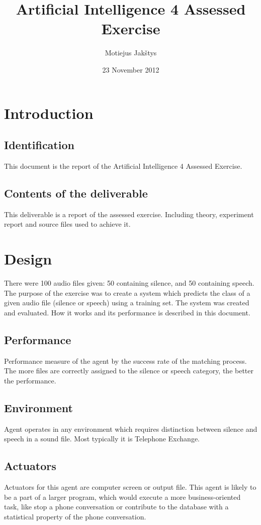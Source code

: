 \documentclass[english,11pt]{article}
\numberwithin{equation}{section}
\begin{document}
\title{Artificial Intelligence 4 Assessed Exercise}
\author{Motiejus Jakštys}
\date{23 November 2012}

\maketitle
\pagebreak
\tableofcontents
\pagebreak

\section{Introduction}
\subsection{Identification}
This document is the report of the Artificial Intelligence 4 Assessed
Exercise.

\subsection{Contents of the deliverable}
This deliverable is a report of the assessed exercise. Including theory,
experiment report and source files used to achieve it.

\section{Design}
There were 100 audio files given: 50 containing silence, and 50 containing
speech. The purpose of the exercise was to create a system which predicts the
class of a given audio file (silence or speech) using a training set. The
system was created and evaluated. How it works and its performance is described
in this document.

\subsection{Performance}
Performance measure of the agent by the success rate of the matching
process. The more files are correctly assigned to the silence or speech
category, the better the performance.

\subsection{Environment}
Agent operates in any environment which requires distinction between silence
and speech in a sound file. Most typically it is Telephone Exchange.

\subsection{Actuators}
Actuators for this agent are computer screen or output file. This agent is
likely to be a part of a larger program, which would execute a more
business-oriented task, like stop a phone conversation or contribute to the
database with a statistical property of the phone conversation.
\end{document}
